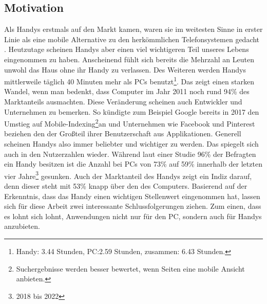 \subsection{Motivation}\label{subsection:motivation}
%
Als Handys erstmals auf den Markt kamen, waren sie im weitesten Sinne in erster Linie als eine mobile Alternative zu den herkömmlichen Telefonsystemen gedacht \cite{einleitung_handy_erfindung} . Heutzutage scheinen Handys aber einen viel wichtigeren Teil unseres Lebens eingenommen zu haben. Anscheinend fühlt sich bereits die Mehrzahl an Leuten unwohl das Haus ohne ihr Handy zu verlassen\cite{pcVsphone_feelingUneasyWhenLeavingPhoneHome}. Des Weiteren werden Handys mittlerweile täglich 40 Minuten mehr als PCs benutzt\cite{pcVsphone_phoneScreenTime,pcVsphone_totalScreenTime,pcVsphone_totalScreenTime2}\footnote{Handy: 3.44 Stunden, PC:2.59 Stunden, zusammen: 6.43 Stunden.}. Das zeigt einen starken Wandel, wenn man bedenkt, dass Computer im Jahr 2011 noch rund 94\% des Marktanteils ausmachten\cite{pcVsphone_smartphoneWebTrafficHigherThanPc}. Diese Veränderung scheinen auch Entwickler und Unternehmen zu bemerken. So kündigte zum Beispiel Google bereits in 2017 den Umstieg auf Mobile-Indexing\footnote{Suchergebnisse werden besser bewertet, wenn Seiten eine mobile Ansicht anbieten.}an\cite{pcVsphone_mobileFirstIndexing} und Unternehmen wie Facebook und Pinterest beziehen den der Großteil ihrer Benutzerschaft aus Applikationen\cite{pcVsphone_socialMediaFacebookMobileUsage,pcVsphone_socialMediaPinterestMobileUsage}.\newline%
Generell scheinen Handys also immer beliebter und wichtiger zu werden. Das spiegelt sich auch in den Nutzerzahlen wieder. Während laut einer Studie 96\% der Befragten ein Handy besitzen ist die Anzahl bei PCs von 73\% auf 59\% innerhalb der letzten vier Jahre\footnote{2018 bis 2022} gesunken\cite{pcVsphone_deviceOwnership}. Auch der Marktanteil des Handys zeigt ein Indiz darauf, denn dieser steht mit 53\% knapp über den des Computers\cite{pcVsphone_smartphoneWebTrafficHigherThanPc}.%
%
\newline
\myNewSection%
Basierend auf der Erkenntnis, dass das Handy einen wichtigen Stellenwert eingenommen hat, lassen sich für diese Arbeit zwei interessante Schlussfolgerungen ziehen.\newline
Zum einen, dass es lohnt sich lohnt, Anwendungen nicht nur für den PC, sondern auch für Handys anzubieten.\newline%
